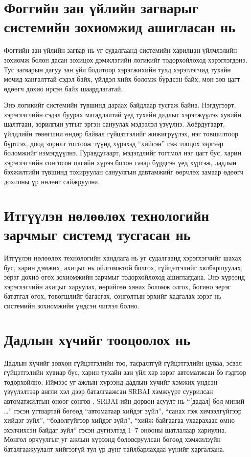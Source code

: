 \section{Фоггийн зан үйлийн загварыг системийн зохиомжид ашигласан нь}

Фоггийн зан үйлийн загвар нь уг судалгаанд системийн харилцан үйлчлэлийн зохиомж болон дасан зохицох дэмжлэгийн логикийг тодорхойлоход хэрэглэгдэнэ. Тус загварын дагуу зан үйл бодитоор хэрэгжихийн тулд хэрэглэгчид тухайн мөчид хангалттай сэдэл байх, үйлдэл хийх боломж бүрдсэн байх, мөн зөв цагт өдөөгч дохио ирсэн байх шаардлагатай.

Энэ логикийг системийн түвшинд дараах байдлаар тусгаж байна. Нэгдүгээрт, хэрэглэгчийн сэдэл буурах магадлалтай үед тухайн дадлыг хэрэгжүүлэх хувийн шалтгаан, зорилгын утгыг эргэн сануулах мэдээлэл үзүүлнэ. Хоёрдугаарт, үйлдлийн төвөгшил өндөр байвал гүйцэтгэлийг жижигрүүлэх, нэг товшилтоор бүртгэх, доод зорилт тогтоож түүнд хүрэхэд ``хийсэн'' гэж тооцох зэргээр боломжийг нэмэгдүүлнэ. Гуравдугаарт, мэдэгдлийг тогтмол нэг цагт бус, харин хэрэглэгчийн сонгосон цагийн хүрээ болон газар бүрдсэн үед хүргэж, дадлын бэхжилтийн түвшинд тохируулан сануулгын давтамжийг өөрчлөх замаар өдөөгч дохионы үр нөлөөг сайжруулна.

\section{Итгүүлэн нөлөөлөх технологийн зарчмыг системд тусгасан нь}

Итгүүлэн нөлөөлөх технологийн хандлага нь уг судалгаанд хэрэглэгчийг шахах бус, харин дэмжих, ахицыг нь ойлгомжтой болгох, гүйцэтгэлийг хялбаршуулах, эерэг дохио өгөх зохиомжийн зарчмыг тодорхойлоход ашиглагдана. Энэ хүрээнд хэрэглэгчийн ахицыг харуулах, өөрийгөө хянах боломж олгох, богино эерэг бататгал өгөх, төвөгшлийг багасгах, сонголтын эрхийг хадгалах зэрэг нь системийн зохиомжийн үндсэн чиглэл болно.

\section{Дадлын хүчийг тооцоолох нь}

Дадлын хүчийг зөвхөн гүйцэтгэлийн тоо, тасралтгүй гүйцэтгэлийн цуваа, эсвэл гүйцэтгэлийн хувиар бус, харин тухайн зан үйл хэр зэрэг автоматжсан бэ гэдгээр тодорхойлно. Иймээс уг ажлын хүрээнд дадлын хүчийг хэмжих үндсэн үзүүлэлтээр англи хэл дээр баталгаажсан SRBAI хэмжүүрт суурилсан автоматжилтын оноог сонгов \cite{ref9}. SRBAI-ийн дөрвөн асуулт нь ``[дадал] бол миний \ldots'' гэсэн угтвартай бөгөөд ``автоматаар хийдэг зүйл'', ``санах гэж хичээлгүйгээр хийдэг зүйл'', ``бодолгүйгээр хийдэг зүйл'', ``хийж байгаагаа ухаарахаас өмнө эхэлчихсэн байдаг зүйл'' гэсэн дүгнэлтэд 1--7 онооны шатлалаар хариулна. Монгол орчуулгыг уг ажлын хүрээнд боловсруулсан бөгөөд хэмжилзүйн баталгаажуулалт хийгээгүй тул үр дүнг тайлбарлахдаа үүнийг харгалзана.

